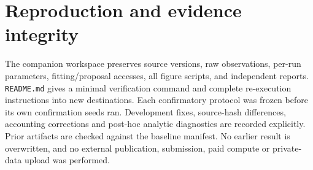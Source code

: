 \documentclass[11pt]{article}
\theoremstyle{remark}\newtheorem{remark}[theorem]{Remark}
\begin{document}
\section{Reproduction and evidence integrity}
The companion workspace preserves source versions, raw observations,
per-run parameters, fitting/proposal accesses, all figure scripts, and
independent reports. \texttt{README.md} gives a minimal verification command
and complete re-execution instructions into new destinations. Each
confirmatory protocol was frozen before its own confirmation seeds ran.
Development fixes, source-hash differences, accounting corrections and
post-hoc analytic diagnostics are recorded explicitly. Prior artifacts are
checked against the baseline manifest. No earlier result is overwritten,
and no external publication, submission, paid compute or private-data
upload was performed.

\appendix




\end{document}
